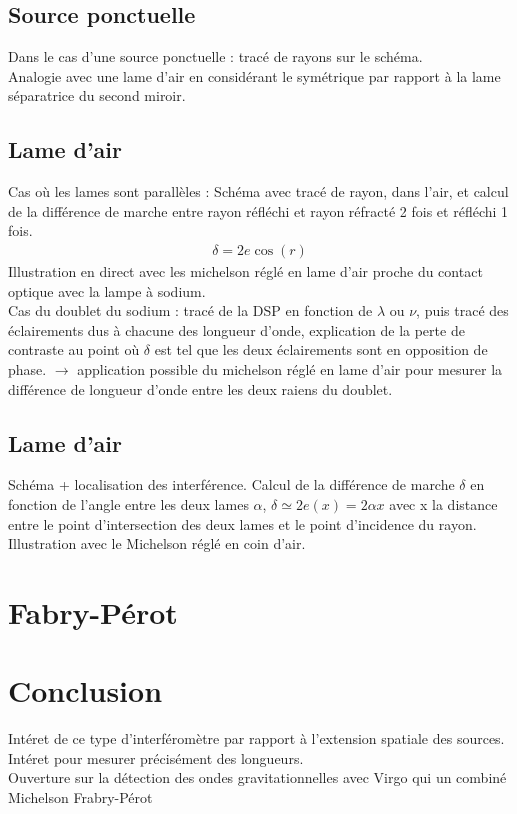 \documentclass[12pt,prb,aps,epsf]{report}
\begin{document}
\subsection{Source ponctuelle}
Dans le cas d'une source ponctuelle : tracé de rayons sur le schéma.\\
Analogie avec une lame d'air en considérant le symétrique par rapport à la lame séparatrice du second miroir.\\
\subsection{Lame d'air}
Cas où les lames sont parallèles : Schéma avec tracé de rayon, dans l'air, et calcul de la différence de marche entre rayon réfléchi et rayon réfracté 2 fois et réfléchi 1 fois.
\begin{eqnarray}
\delta = 2e\cos(r)
\end{eqnarray}
Illustration en direct avec les michelson réglé en lame d'air proche du contact optique avec la lampe à sodium.\\
Cas du doublet du sodium : tracé de la DSP en fonction de $\lambda$ ou $\nu$, puis tracé des éclairements dus à chacune des longueur d'onde, explication de la perte de contraste au point où $\delta$ est tel que les deux éclairements sont en opposition de phase. $\rightarrow$ application possible du michelson réglé en lame d'air pour mesurer la différence de longueur d'onde entre les deux raiens du doublet.

\subsection{Lame d'air}
Schéma + localisation des interférence. Calcul de la différence de marche  $\delta$ en fonction de l'angle entre les deux lames $\alpha$, $\delta \simeq 2e(x) = 2 \alpha x$ avec x la distance entre le point d'intersection des deux lames et le point d'incidence du rayon.\\
Illustration avec le Michelson réglé en coin d'air.

\section{Fabry-Pérot}

\section*{Conclusion}
Intéret de ce type d'interféromètre par rapport à l'extension spatiale des sources.\\
Intéret pour mesurer précisément des longueurs.\\
Ouverture sur la détection des ondes gravitationnelles avec Virgo qui un combiné Michelson Frabry-Pérot
\end{document}
